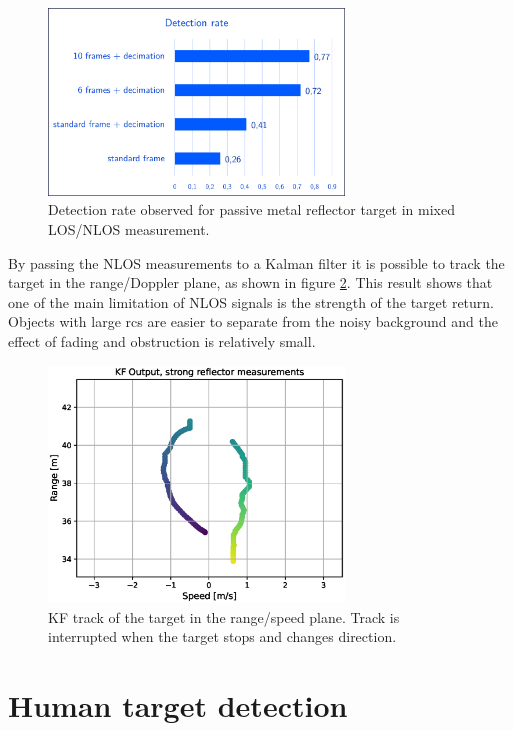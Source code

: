 \begin{figure}[H]
	\centering
	\includegraphics[width=0.7\textwidth]{Images/Test1/detect_hist/detect_hist_cabinet_LMsans.png}
	\caption{\small Detection rate observed for passive metal reflector target in mixed LOS/NLOS measurement.}
	\label{fig:Test1_detect_rate_strong_ref}
\end{figure}
By passing the NLOS measurements to a Kalman filter it is possible to track the target in the range/Doppler plane, as shown in figure \ref{fig:Test1_kf_track_strong_ref}. This result shows that one of the main limitation of NLOS signals is the strength of the target return. Objects with large \gls{rcs} are easier to separate from the noisy background and the effect of fading and obstruction is relatively small.
\begin{figure}[H]
	\centering
	\includegraphics[width=0.7\textwidth]{Images/Test1/kf_track.eps}
	\caption{\small KF track of the target in the range/speed plane. Track is interrupted when the target stops and changes direction.}
	\label{fig:Test1_kf_track_strong_ref}
\end{figure}


\section{Human target detection}

